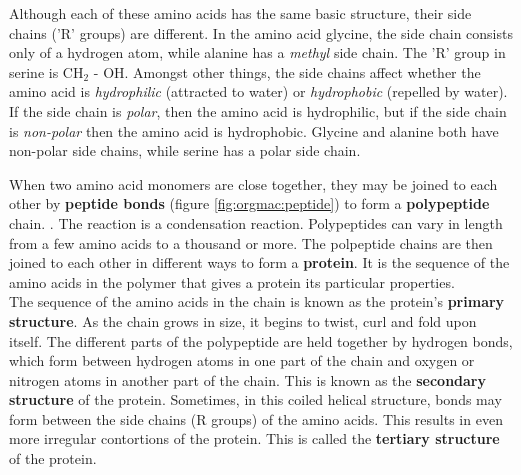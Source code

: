 Although each of these amino acids has the same basic structure, their side chains ('R' groups) are different. In the amino acid glycine, the side chain consists only of a hydrogen atom, while alanine has a \textit{methyl} side chain. The 'R' group in serine is CH$_{2}$ - OH. Amongst other things, the side chains affect whether the amino acid is \textit{hydrophilic} (attracted to water) or \textit{hydrophobic} (repelled by water). If the side chain is \textit{polar}, then the amino acid is hydrophilic, but if the side chain is \textit{non-polar} then the amino acid is hydrophobic. Glycine and alanine both have non-polar side chains, while serine has a polar side chain.

When two amino acid monomers are close together, they may be joined to each other by \textbf{peptide bonds} (figure \ref{fig:orgmac:peptide}) to form a \textbf{polypeptide} chain. . The reaction is a condensation reaction. Polypeptides can vary in length from a few amino acids to a thousand or more. The polpeptide chains are then joined to each other in different ways to form a \textbf{protein}. It is the sequence of the amino acids in the polymer that gives a protein its particular properties.\\

The sequence of the amino acids in the chain is known as the protein's \textbf{primary structure}. As the chain grows in size, it begins to twist, curl and fold upon itself. The different parts of the polypeptide are held together by hydrogen bonds, which form between hydrogen atoms in one part of the chain and oxygen or nitrogen atoms in another part of the chain. This is known as the \textbf{secondary structure} of the protein. Sometimes, in this coiled helical structure, bonds may form between the side chains (R groups) of the amino acids. This results in even more irregular contortions of the protein. This is called the \textbf{tertiary structure} of the protein.\\

